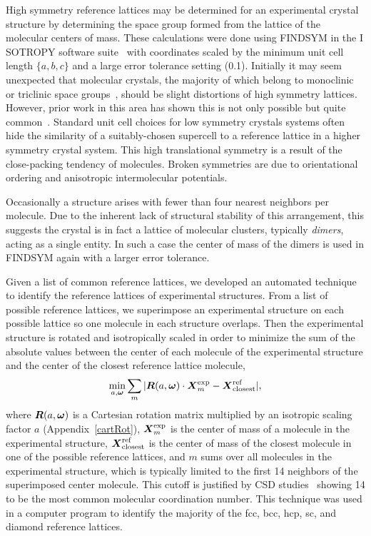 \documentclass[preprint]{revtex4}              %
\newcommand{\mb}[1]{\ensuremath{\mbox{\boldmath $ #1 $}}}
\newcommand{\mbss}[1]{\ensuremath{\mbox{\boldmath $ \scriptstyle #1 $}}}
\begin{document}
High symmetry reference lattices may be determined for an
experimental crystal structure by determining the space group formed
from the lattice of the molecular centers of mass. These
calculations were done using F{\small INDSYM} in the I{\small
SOTROPY} software suite~\cite{Stokes02b} with coordinates scaled by
the minimum unit cell length $\{a,b,c\}$ and a large error tolerance
setting (0.1). Initially it may seem unexpected that molecular
crystals, the majority of which belong to monoclinic or triclinic
space groups~\cite{Bassoul00}, should be slight distortions of high
symmetry lattices. However, prior work in this area has shown this
is not only possible but quite
common~\cite{Motherwell97,Reichling00}. Standard unit cell choices
for low symmetry crystals systems often hide the similarity of a
suitably-chosen supercell to a reference lattice in a higher
symmetry crystal system. This high translational symmetry is a
result of the close-packing tendency of molecules. Broken symmetries
are due to orientational ordering and anisotropic intermolecular
potentials.

Occasionally a structure arises with fewer than four nearest
neighbors per molecule.  Due to the inherent lack of structural
stability of this arrangement, this suggests the crystal is in fact
a lattice of molecular clusters, typically \emph{dimers}, acting as
a single entity.  In such a case the center of mass of the dimers is
used in F{\small INDSYM} again with a larger error tolerance.

Given a list of common reference lattices, we developed an automated
technique to identify the reference lattices of experimental
structures. From a list of possible reference lattices, we
superimpose an experimental structure on each possible lattice so
one molecule in each structure overlaps. Then the experimental
structure is rotated and isotropically scaled in order to minimize
the sum of the absolute values between the center of each molecule
of the experimental structure and the center of the closest
reference lattice molecule,
\begin{equation}
\min_{a,\mbss{\omega}}\sum_m|\mb{R}(a,\mb{\omega})\cdot\mb{X}^{\mathrm{exp}}_m
 - \mb{X}^{\mathrm{ref}}_{\mathrm{closest}}|,
\end{equation}
where $\mb{R}(a,\mb{\omega})$ is a Cartesian rotation matrix
multiplied by an isotropic scaling factor $a$
(Appendix~\ref{cartRot}), $\mb{X}^{\mathrm{exp}}_m$ is the center of
mass of a molecule in the experimental structure,
$\mb{X}^{\mathrm{ref}}_{\mathrm{closest}}$ is the center of mass of
the closest molecule in one of the possible reference lattices, and
$m$ sums over all molecules in the experimental structure, which is
typically limited to the first 14 neighbors of the superimposed
center molecule.  This cutoff is justified by CSD
studies~\cite{Peresypkina00} showing 14 to be the most common
molecular coordination number. This technique was used in a computer
program to identify the majority of the fcc, bcc, hcp, sc, and
diamond reference lattices.
\end{document}
